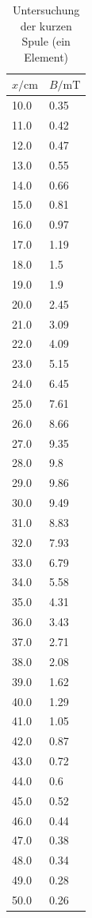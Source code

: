 \documentclass[11pt,ngerman,a4paper]{article}
\begin{document}
\begin{table}[H]
\centering
\begin{tabular}{ll}
\toprule
{$x / \si{\centi\meter}$} &{ $B/\si{\milli\tesla}$ }\\
\midrule
10.0 & 0.35\\
11.0 & 0.42\\
12.0 & 0.47\\
13.0 & 0.55\\
14.0 & 0.66\\
15.0 & 0.81\\
16.0 & 0.97\\
17.0 & 1.19\\
18.0 & 1.5\\
19.0 & 1.9\\
20.0 & 2.45\\
21.0 & 3.09\\
22.0 & 4.09\\
23.0 & 5.15\\
24.0 & 6.45\\
25.0 & 7.61\\
26.0 & 8.66\\
27.0 & 9.35\\
28.0 & 9.8\\
29.0 & 9.86\\
30.0 & 9.49\\
31.0 & 8.83\\
32.0 & 7.93\\
33.0 & 6.79\\
34.0 & 5.58\\
35.0 & 4.31\\
36.0 & 3.43\\
37.0 & 2.71\\
38.0 & 2.08\\
39.0 & 1.62\\
40.0 & 1.29\\
41.0 & 1.05\\
42.0 & 0.87\\
43.0 & 0.72\\
44.0 & 0.6\\
45.0 & 0.52\\
46.0 & 0.44\\
47.0 & 0.38\\
48.0 & 0.34\\
49.0 & 0.28\\
50.0 & 0.26\\
\bottomrule
\end{tabular}
\label{}
\caption{Untersuchung der kurzen Spule (ein Element)}
\end{table}
\end{document}
